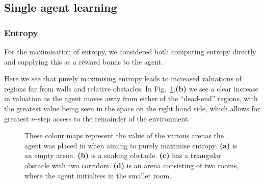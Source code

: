 \documentclass{article}
\begin{document}
\subsection{Single agent learning\label{singlesect}}
\subsubsection{Entropy \label{entres}}
For the maximisation of entropy, we considered both computing entropy directly and supplying this as a reward bonus to the agent.

Here we see that purely maximising entropy leads to increased valuations of regions far from walls and relative obstacles. In Fig.~\ref{entfigs}.\textbf{(b)} we see a clear increase in valuation as the agent moves away from either of the ``dead-end'' regions, with the greatest value being seen in the space on the right hand side, which allows for greatest $n$-step access to the remainder of the environment.

\begin{figure}[ht]
\centering
{}
\caption{These colour maps represent the value of the various arenas the agent was placed in when aiming to purely maximise entropy. \textbf{(a)} is an empty arena. \textbf{(b)} is a snaking obstacle. \textbf{(c)} has a triangular obstacle with two corridors. \textbf{(d)} is an arena consisting of two rooms, where the agent initialises in the smaller room.\label{entfigs}}
\end{figure}
\end{document}
